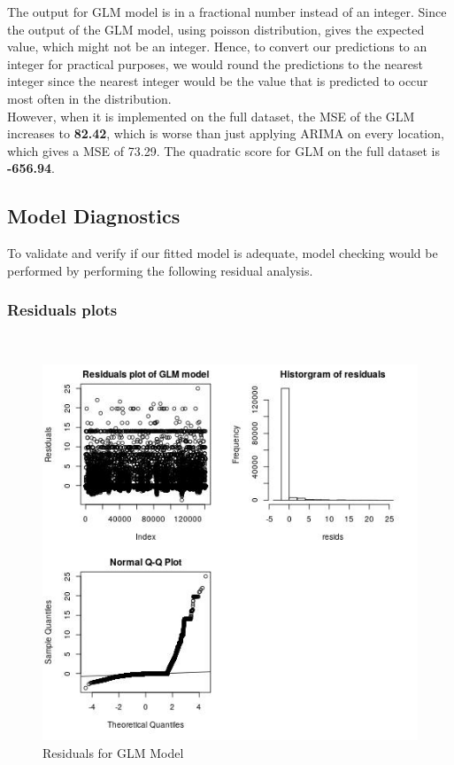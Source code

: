 \documentclass[nonblindrev,msom]{informs3} %
\begin{document}
\noindent The output for GLM model is in a fractional number instead of an integer. Since the output of the GLM model, using poisson distribution, gives the expected value, which might not be an integer. Hence, to convert our predictions to an integer for practical purposes, we would round the predictions to the nearest integer since the nearest integer would be the value that is predicted to occur most often in the distribution. \\

\noindent However, when it is implemented on the full dataset, the MSE of the GLM increases to \textbf{82.42}, which is worse than just applying ARIMA on every location, which gives a MSE of 73.29. The quadratic score for GLM on the full dataset is \textbf{-656.94}.

\subsection{Model Diagnostics}
To validate and verify if our fitted model is adequate, model checking would be performed by performing the following residual analysis.		

\newpage
\subsubsection{Residuals plots}
\hfill\\
\begin{figure}[H]
    \centering
    \includegraphics[width=\textwidth, height=0.7\textheight]{Images/Full_GLM_resids.jpg}
    \caption{Residuals for GLM Model}
    \label{fig:Residuals for GLM Model}
\end{figure}
\end{document}
